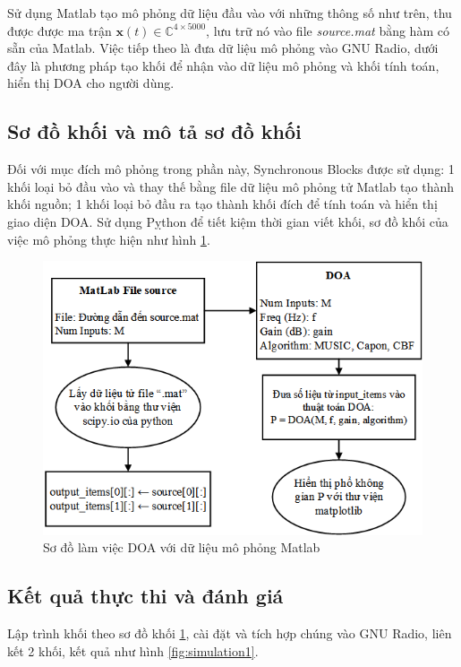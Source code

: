 {Sử dụng Matlab tạo mô phỏng dữ liệu đầu vào với những thông số như trên, thu được được ma trận $\mathbf{x}(t) \in \mathbb{C}^{4 \times 5000}$, lưu trữ nó vào file \textit{source.mat} bằng hàm có sẵn của Matlab. Việc tiếp theo là đưa dữ liệu mô phỏng vào GNU Radio, dưới đây là phương pháp tạo khối để nhận vào dữ liệu mô phỏng và khối tính toán, hiển thị DOA cho người dùng.

\subsection{Sơ đồ khối và mô tả sơ đồ khối}

Đối với mục đích mô phỏng trong phần này, Synchronous Blocks được sử dụng: 1 khối loại bỏ đầu vào và thay thế bằng file dữ liệu mô phỏng tử Matlab tạo thành khối nguồn; 1 khối loại bỏ đầu ra tạo thành khối đích để tính toán và hiển thị giao diện DOA. Sử dụng Pỵthon để tiết kiệm thời gian viết khối, sơ đồ khối của việc mô phỏng thực hiện như hình \ref{fig:simulation}.

\begin{figure} [h]
	\centering
	\includegraphics[width=0.9\linewidth]{figures/simulation.png}
	\caption{Sơ đồ làm việc DOA với dữ liệu mô phỏng Matlab}
	\label{fig:simulation}
\end{figure}

\subsection{Kết quả thực thi và đánh giá}

Lập trình khối theo sơ đồ khối \ref{fig:simulation}, cài đặt và tích hợp chúng vào GNU Radio, liên kết 2 khối, kết quả như hình \ref{fig:simulation1}.

}
